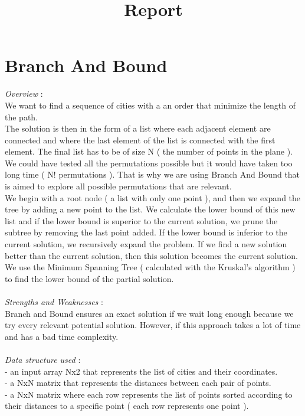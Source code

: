 \documentclass[12pt]{article}
\begin{document}
\title{Report}
\maketitle

\section{Branch And Bound}

\textit{Overview} : \\
We want to find a sequence of cities with a an order that minimize the length of the path. \\
The solution is then in the form of a list where each adjacent element are connected and where the last element of the list is connected with the first element. The final list has to be of size N ( the number of points in the plane ). We could have tested all the permutations possible but it would have taken too long time ( N! permutations ). That is why we are using Branch And Bound that is aimed to explore all possible permutations that are relevant.\\
We begin with a root node ( a list with only one point ), and then we expand the tree by adding a new point to the list. We calculate the lower bound of this new list and if the lower bound is superior to the current solution, we prune the subtree by removing the last point added. If the lower bound is inferior to the current solution, we recursively expand the problem. If we find a new solution better than the current solution, then this solution becomes the current solution. \\
We use the Minimum Spanning Tree ( calculated with the Kruskal's algorithm ) to find the lower bound of the partial solution. \\
\\
\textit{Strengths and Weaknesses} : \\
Branch and Bound ensures an exact solution if we wait long enough because we try every relevant potential solution. However, if this approach takes a lot of time and has a bad time complexity.\\
\\
\textit{Data structure used} : \\
- an input array Nx2 that represents the list of cities and their coordinates. \\
- a NxN matrix that represents the distances between each pair of points. \\
- a NxN matrix where each row represents the list of points sorted according to their distances to a specific point ( each row represents one point ). \\
\end{document}
